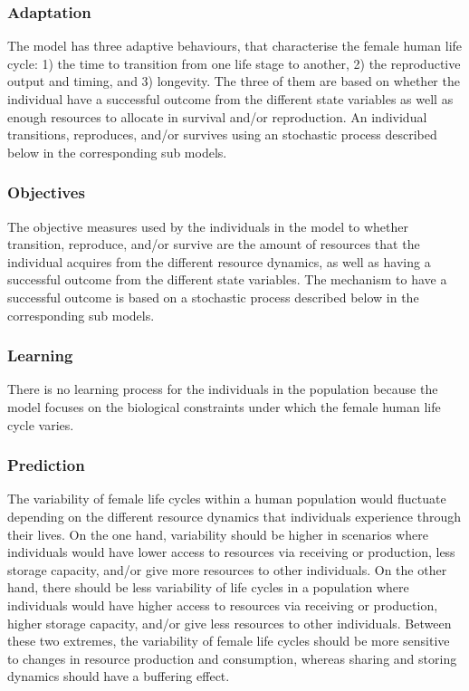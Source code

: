 \documentclass{article}
\begin{document}
\subsubsection{Adaptation}

The model has three adaptive behaviours, that characterise the female human life cycle: 1) the time to transition from one life stage to another, 2) the reproductive output and timing, and 3) longevity. The three of them are based on whether the individual have a successful outcome from the different state variables as well as enough resources to allocate in survival and/or reproduction. An individual transitions, reproduces, and/or survives using an stochastic process described below in the corresponding sub models.

\subsubsection{Objectives}

The objective measures used by the individuals in the model to whether transition, reproduce, and/or survive are the amount of resources that the individual acquires from the different resource dynamics, as well as having a successful outcome from the different state variables. The mechanism to have a successful outcome is based on a stochastic process described below in the corresponding sub models.

\subsubsection{Learning}

There is no learning process for the individuals in the population because the model focuses on the biological constraints under which the female human life cycle varies.

\subsubsection{Prediction}

The variability of female life cycles within a human population would fluctuate depending on the different resource dynamics that individuals experience through their lives. On the one hand, variability should be higher in scenarios where individuals would have lower access to resources via receiving or production, less storage capacity, and/or give more resources to other individuals. On the other hand, there should be less variability of life cycles in a population where individuals would have higher access to resources via receiving or production, higher storage capacity, and/or give less resources to other individuals. Between these two extremes, the variability of female life cycles should be more sensitive to changes in resource production and consumption, whereas sharing and storing dynamics should have a buffering effect.
\end{document}

